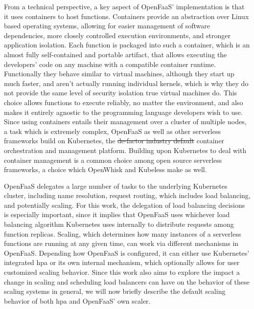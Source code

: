 \documentclass[draft,final]{vutinfth} %
\providecommand{\DIFaddtex}[1]{{\protect\color{blue}\uwave{#1}}} %
\providecommand{\DIFdeltex}[1]{{\protect\color{red}\sout{#1}}}                      %
\providecommand{\DIFaddbegin}{} %
\providecommand{\DIFaddend}{} %
\providecommand{\DIFdelbegin}{} %
\providecommand{\DIFdelend}{} %
\providecommand{\DIFadd}[1]{\texorpdfstring{\DIFaddtex{#1}}{#1}} %
\providecommand{\DIFdel}[1]{\texorpdfstring{\DIFdeltex{#1}}{}} %
\begin{document}
From a technical perspective, a key aspect of OpenFaaS' implementation is that it uses containers to host functions.
Containers provide an abstraction over Linux based operating systems, allowing for easier management of software dependencies, more closely controlled execution environments, and stronger application isolation.
Each function is packaged into such a container, which is an almost fully self-contained and portable artifact, that allows executing the developers' code on any machine with a compatible container runtime.
Functionally they behave similar to virtual machines, although they start up much faster, and aren't actually running individual kernels, which is why they do not provide the same level of security isolation true virtual machines do.
This choice allows functions to execute reliably, no matter the environment, and also makes it entirely agnostic to the programming language developers wish to use.
Since using containers entails their management over a cluster of multiple nodes, a task which is extremely complex, OpenFaaS\cite{openfaas} as well as other serverless frameworks build on Kubernetes\cite{kubernetes}, the \DIFdelbegin \DIFdel{de-factor industry default }\DIFdelend \DIFaddbegin \DIFadd{de-facto industry standard }\DIFaddend container orchestration and management platform.
Building upon Kubernetes to deal with container management is a common choice among open source serverless frameworks, a choice which OpenWhisk and Kubeless make as well\cite{mohantyEvaluationOpenSource2018}.

OpenFaaS delegates a large number of tasks to the underlying Kubernetes cluster, including name resolution, request routing, which includes load balancing, and potentially scaling.
For this work, the delegation of load balancing decisions is especially important, since it implies that OpenFaaS uses whichever load balancing algorithm Kubernetes uses internally to distribute requests among function replicas.
Scaling, which determines how many instances of a serverless functions are running at any given time, can work via different mechanisms in OpenFaaS.
Depending how OpenFaaS is configured, it can either use Kubernetes' integrated \gls{hpa}\cite{kubernetes-hpa} or its own internal mechanism, which optionally allows for user customized scaling behavior\cite{openfaas-autoscaling}.
Since this work also aims to explore the impact a change in scaling and scheduling load balancers can have on the behavior of these scaling systems in general, we will now briefly describe the default scaling behavior of both \gls{hpa} and OpenFaaS' own scaler.
\end{document}
